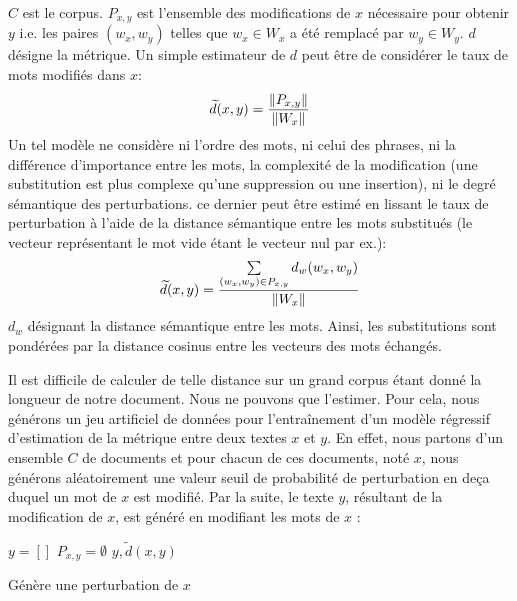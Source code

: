 $C$ est le corpus. $P_{x,y}$ est l'ensemble des modifications de $x$ nécessaire pour obtenir $y$ i.e. les paires $(w_x, w_y)$ telles que $w_x \in W_x$ a été remplacé par $w_y \in W_y$. $d$ désigne la métrique. Un simple estimateur de $d$ peut être de considérer le taux de mots modifiés dans $x$: 
\begin{equation}
\widetilde{d}(x,y) = \frac{\left\lVert P_{x,y} \right\rVert}{\left\lVert W_x\right\rVert}
\end{equation}
 Un tel modèle ne considère ni l'ordre des mots, ni celui des phrases, ni la différence d'importance entre les mots, la complexité de la modification (une substitution est plus complexe qu'une suppression ou une insertion), ni le degré sémantique des perturbations. ce dernier peut être estimé en lissant le taux de perturbation à l'aide de la distance sémantique entre les mots substitués (le vecteur représentant le mot vide étant le vecteur nul par ex.):
\begin{equation}
\widetilde{d}(x,y) = \frac{\sum\limits_{(w_x, w_y) \in P_{x,y}} d_w(w_x,w_y)}{\left\lVert W_x\right\rVert} \label{equation:similarite:somme-dist-mots}
\end{equation}
$d_w$ désignant la distance sémantique entre les mots. Ainsi, les substitutions sont pondérées par la distance cosinus entre les vecteurs des mots échangés.

Il est difficile de calculer de telle distance sur un grand corpus étant donné la longueur de notre document. 
Nous ne pouvons que l'estimer. Pour cela, nous générons un jeu artificiel de données pour l'entraînement d'un modèle régressif d'estimation de la métrique entre deux textes $x$ et $y$. En effet, nous partons d'un ensemble $C$ de documents et pour chacun de ces documents, noté $x$, nous générons aléatoirement une valeur seuil de probabilité de perturbation en deça duquel un mot de $x$ est modifié. Par la suite, le texte  $y$, résultant de la modification de $x$, est généré en modifiant les mots de $x$ :

\begin{algorithm}[!htb] %
 $y = [] $\; 
 $P_{x,y} = \emptyset$\;
 \Return $y, \widetilde{d}(x,y)$\;
 \caption{Génère une perturbation de $x$} \label{algo:similarite:perturbation}
\end{algorithm}


